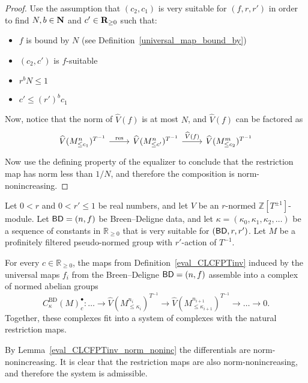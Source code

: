 \begin{proof}
  \leanok
  Use the assumption that $(c_2, c_1)$ is very suitable for $(f, r, r')$
  in order to find $N, b \in \mathbf{N}$ and $c' \in \mathbf{R}_{\ge 0}$ such that:
  \begin{itemize}
    \item $f$ is bound by $N$ (see Definition~\ref{universal_map_bound_by})
    \item $(c_2, c')$ is $f$-suitable
    \item $r ^ b N ≤ 1$
    \item $c' ≤ (r') ^ b c_1$
  \end{itemize}
  Now, notice that the norm of $\hat V(f)$ is at most $N$,
  and $\hat V(f)$ can be factored as
  \[
    \begin{tikzcd}
      \hat V(M_{\le c_1}^n)^{T^{-1}}
      \rar{\mathrm{res}} &
      \hat V(M_{\le c' }^n)^{T^{-1}}
      \rar{\hat V(f)} &
      \hat V(M_{\le c_2}^m)^{T^{-1}}
    \end{tikzcd}
  \]
  Now use the defining property of the equalizer to conclude that
  the restriction map has norm less than $1/N$,
  and therefore the composition is norm-nonincreasing.
\end{proof}

\begin{definition}
  \label{BD_system}
  \leanok
  Let $0 < r$ and $0 < r' \le 1$ be real numbers,
  and let $V$ be an $r$-normed $\mathbb Z[T^{\pm 1}]$-module.
  Let $\mathsf{BD} = (n,f)$ be Breen--Deligne data,
  and let $\kappa = (\kappa_0, \kappa_1, \kappa_2, \dots)$
  be a sequence of constants in $\mathbb R_{\ge 0}$
  that is very suitable for $(\mathsf{BD}, r, r')$.
  Let $M$ be a profinitely filtered pseudo-normed group with $r'$-action of $T^{-1}$.

  For every $c \in \mathbb R_{\ge 0}$,
  the maps from Definition~\ref{eval_CLCFPTinv}
  induced by the universal maps $f_i$ from the Breen--Deligne $\mathsf{BD} = (n,f)$
  assemble into a complex of normed abelian groups
  \[
    C^{\text{BD}}_{\kappa}(M)_c^\bullet \colon
    \dots \to
    \hat V(M_{\le \kappa_i}^{n_i})^{T^{-1}}
    \to
    \hat V(M_{\le \kappa_{i+1}}^{n_{i+1}})^{T^{-1}}
    \to \dots \to 0.
  \]
  Together, these complexes fit into a system of complexes
  with the natural restriction maps.

  By Lemma~\ref{eval_CLCFPTinv_norm_noninc} the differentials are norm-nonincreasing.
  It is clear that the restriction maps are also norm-nonincreasing,
  and therefore the system is admissible.
\end{definition}


